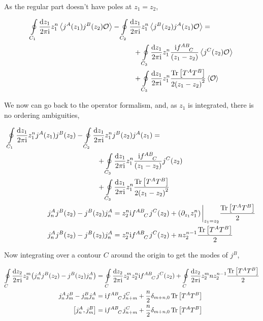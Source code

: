 As the regular part doesn't have poles at $z_1=z_2$, 

\begin{align*}
    \oint\limits_{C_1}\frac{\dd{{z_1}}}{2\pi\im}z_1^n\expval{j^A\qty(z_1)j ^B\qty(z_2)\mathcal O}&-\oint\limits_{C_2}\frac{\dd{{z_1}}}{2\pi\im}z_1^n\expval{j ^B\qty(z_2)j^A\qty(z_1)\mathcal O}=\\
    &\quad\quad\quad+\oint\limits_{C_3}\frac{\dd{{z_1}}}{2\pi\im}z_1^n\frac{\im\tensor{f}{^A^B_C}}{\qty(z_1-z_2)}\expval{j^C\qty(z_2)\mathcal O}\\
    &\quad\quad\quad+\oint\limits_{C_3}\frac{\dd{{z_1}}}{2\pi\im}z_1^n\frac{\Tr\qty[T^A T^B]}{2\qty(z_1-z_2)^2}\expval{\mathcal O}
\end{align*}

We now can go back to the operator formalism, and, as $z_1$ is integrated, there is no ordering ambiguities,

\begin{align*}
    \oint\limits_{C_1}\frac{\dd{{z_1}}}{2\pi\im}z_1^nj^A\qty(z_1)j ^B\qty(z_2)&-\oint\limits_{C_2}\frac{\dd{{z_1}}}{2\pi\im}z_1^nj ^B\qty(z_2)j^A\qty(z_1)=\\
    &\quad\quad\quad+\oint\limits_{C_3}\frac{\dd{{z_1}}}{2\pi\im}z_1^n\frac{\im\tensor{f}{^A^B_C}}{\qty(z_1-z_2)}j^C\qty(z_2)\\
    &\quad\quad\quad+\oint\limits_{C_3}\frac{\dd{{z_1}}}{2\pi\im}z_1^n\frac{\Tr\qty[T^A T^B]}{2\qty(z_1-z_2)^2}\\
    j_n^Aj ^B\qty(z_2)&-j ^B\qty(z_2)j^A_n=z_2^n\im\tensor{f}{^A^B_C}j^C\qty(z_2)+\qty(\partial_{z_1}z_1^n)\eval_{z_1=z_2}\frac{\Tr\qty[T^A T^B]}{2}\\
    j_n^Aj ^B\qty(z_2)&-j ^B\qty(z_2)j^A_n=z_2^n\im\tensor{f}{^A^B_C}j^C\qty(z_2)+nz_2^{n-1}\frac{\Tr\qty[T^A T^B]}{2}
\end{align*}

Now integrating over a contour $C$ around the origin to get the modes of $j ^B$,

\begin{align*}
    \oint\limits_C\frac{\dd{z_2}}{2\pi\im}z_2^m \qty(j_n^Aj ^B\qty(z_2)-j ^B\qty(z_2)j^A_n)&=\oint\limits_C\frac{\dd{z_2}}{2\pi\im}z_2^m z_2^n\im\tensor{f}{^A^B_C}j^C\qty(z_2)+\oint\limits_C\frac{\dd{z_2}}{2\pi\im}z_2^m nz_2^{n-1}\frac{\Tr\qty[T^A T^B]}{2}\\
    j_n^Aj ^B_m-j ^B_mj^A_n&=\im\tensor{f}{^A^B_C}j^C_{n+m}+\frac{n}{2}\delta_{m+n,0} \Tr\qty[T^A T^B]\\
    \comm{j_n^A}{j ^B_m}&=\im\tensor{f}{^A^B_C}j^C_{n+m}+\frac{n}{2}\delta_{m+n,0} \Tr\qty[T^A T^B]
\end{align*}

